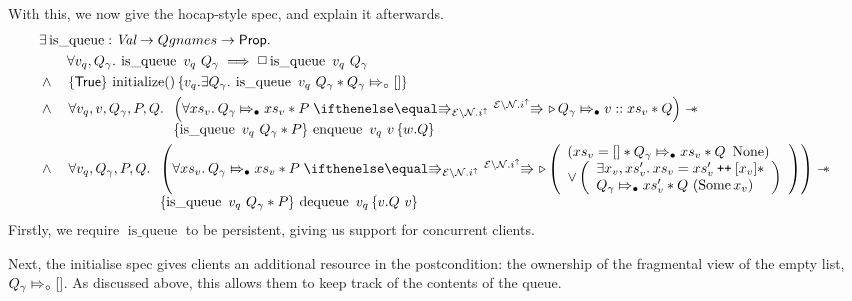 \documentclass[twoside,11pt,openright]{report}
\newcommand{\initialise}{\operatorname{initialize}}
\newcommand{\enqueue}{\operatorname{enqueue}}
\newcommand{\dequeue}{\operatorname{dequeue}}
\newcommand{\isqueue}{\operatorname{is\_queue}}
\newcommand{\Qg}{Q_\gname}
\newcommand\catenate{\mathbin{\text{\ttfamily\upshape ++}}}
\newcommand{\Nl}{\ensuremath{\mathcal{N}}}
\newcommand{\abstractstatefullfrag}[2]{#1 \Mapsto_{\circ} #2}
\newcommand{\abstractstateauth}[2]{#1 \Mapsto_{\bullet} #2}
\begin{document}
With this, we now give the hocap-style spec, and explain it afterwards. 
\begin{align*}
  &\Exists \isqueue : \Val \to Qgnames \to \Prop.\\
  &\quad\quad \All v_q, Q_\gname . \isqueue \ v_q \ Q_\gname \implies \persistently \isqueue \ v_q \ Q_\gname\\
  &\land\quad\hoare{\TRUE}{\initialise \TT}{v_q . \Exists Q_\gname . \isqueue\ v_q \ Q_\gname \ast \abstractstatefullfrag{\Qg}{[]} }\\
  &\land\quad \All v_q, v, Q_\gname, P, Q.
    \begin{array}[t]{l}
    \left(\All xs_v . \abstractstateauth{\Qg}{xs_v} \ast P \vs[\mask\setminus\Nl.i^\uparrow] \later \abstractstateauth{\Qg}{v :: xs_v} \ast Q \right)
    \wand\\
    \hoare{\isqueue \ v_q \ Q_\gname \ast P}{\enqueue\ v_q\ v}{w . Q}
    \end{array}\\
  &\land\quad \All v_q, Q_\gname, P, Q.
    \begin{array}[t]{l}
    \left(\All xs_v . \abstractstateauth{\Qg}{xs_v} \ast P \vs[\mask\setminus\Nl.i^\uparrow] \later 
      \left( 
        \begin{array}{l}
          (xs_v = [] \ast \abstractstateauth{\Qg}{xs_v} \ast Q \ \None)\\
          \lor
          \left(
            \begin{array}{l}
              \Exists x_v, xs_v' . xs_v = xs_v' \catenate [x_v] \ast\\
              \abstractstateauth{\Qg}{xs_v'} \ast Q \ (\Some{x_v})
            \end{array}
            \right)
        \end{array}
      \right) \right)
    \wand\\
    \hoare{\isqueue \ v_q \ Q_\gname \ast P}{\dequeue\ v_q}{v . Q\ v}
    \end{array}
\end{align*}
Firstly, we require $\isqueue$ to be persistent, giving us support for concurrent clients.

Next, the initialise spec gives clients an additional resource in the postcondition: the ownership of the fragmental view of the empty list, $\abstractstatefullfrag{\Qg}{[]}$. As discussed above, this allows them to keep track of the contents of the queue.
\end{document}
